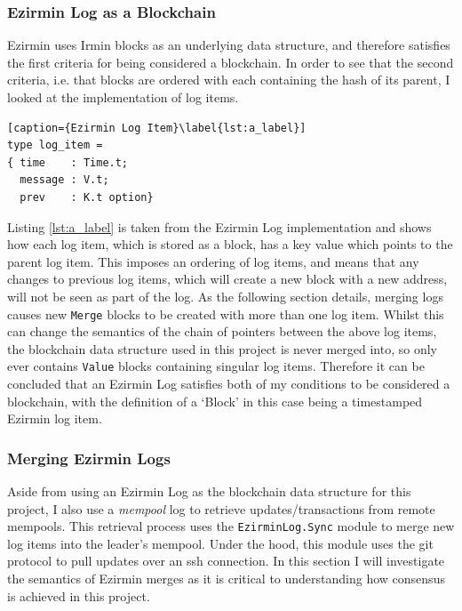 \documentclass[12pt,a4paper,twoside,openright]{report}
\begin{document}
	\subsubsection*{Ezirmin Log as a Blockchain}
	Ezirmin uses Irmin blocks as an underlying data structure, and therefore satisfies the first criteria for being considered a blockchain. 
	In order to see that the second criteria, i.e. that blocks are ordered with each containing the hash of its parent, I looked at the implementation of log items.

	\begin{lstlisting}[caption={Ezirmin Log Item}\label{lst:a_label}]
type log_item =
{ time    : Time.t;
  message : V.t;
  prev    : K.t option}
	\end{lstlisting}

	Listing \ref{lst:a_label} is taken from the Ezirmin Log implementation and shows how each log item, which is stored as a block, has a key value which points to the parent log item. 
	This imposes an ordering of log items, and means that any changes to previous log items, which will create a new block with a new address, will not be seen as part of the log. 
	As the following section details, merging logs causes new \texttt{Merge} blocks to be created with more than one log item.
	Whilst this can change the semantics of the chain of pointers between the above log items, the blockchain data structure used in this project is never merged into, so only ever contains \texttt{Value} blocks containing singular log items.
	Therefore it can be concluded that an Ezirmin Log satisfies both of my conditions to be considered a blockchain, with the definition of a `Block' in this case being a timestamped Ezirmin log item.

	\subsubsection*{Merging Ezirmin Logs}
	Aside from using an Ezirmin Log as the blockchain data structure for this project, I also use a \textit{mempool} log to retrieve updates/transactions from remote mempools. 
	This retrieval process uses the \texttt{EzirminLog.Sync} module to merge new log items into the leader's mempool.
	Under the hood, this module uses the git protocol to pull updates over an ssh connection.
	In this section I will investigate the semantics of Ezirmin merges as it is critical to understanding how consensus is achieved in this project.\\
	
\end{document}
